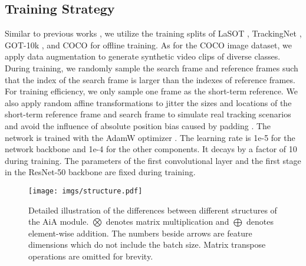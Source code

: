 \subsection{Training Strategy}
Similar to previous works \cite{danelljan2019atom,bhat2019learning,chen2021transformer,wang2021transformer,yan2021learning}, we utilize the training splits of LaSOT \cite{fan2019lasot}, TrackingNet \cite{muller2018trackingnet}, GOT-10k \cite{huang2019got}, and COCO \cite{lin2014microsoft} for offline training. As for the COCO image dataset, we apply data augmentation to generate synthetic video clips of diverse classes. During training, we randomly sample the search frame and reference frames such that the index of the search frame is larger than the indexes of reference frames. For training efficiency, we only sample one frame as the short-term reference. We also apply random affine transformations to jitter the sizes and locations of the short-term reference frame and search frame to simulate real tracking scenarios and avoid the influence of absolute position bias caused by padding \cite{islam2020much,li2019siamrpn++,zhang2019deeper}. The network is trained with the AdamW optimizer \cite{loshchilov2017decoupled}. The learning rate is 1e-5 for the network backbone and 1e-4 for the other components. It decays by a factor of 10 during training. The parameters of the first convolutional layer and the first stage in the ResNet-50 \cite{he2016deep} backbone are fixed during training.

\begin{figure}[t]
\centering
\texttt{[image: imgs/structure.pdf]}
\caption{Detailed illustration of the differences between different structures of the AiA module. $\bigotimes$ denotes matrix multiplication and $\bigoplus$ denotes element-wise addition. The numbers beside arrows are feature dimensions which do not include the batch size. Matrix transpose operations are omitted for brevity.}
\label{figure-structure}
\end{figure}

